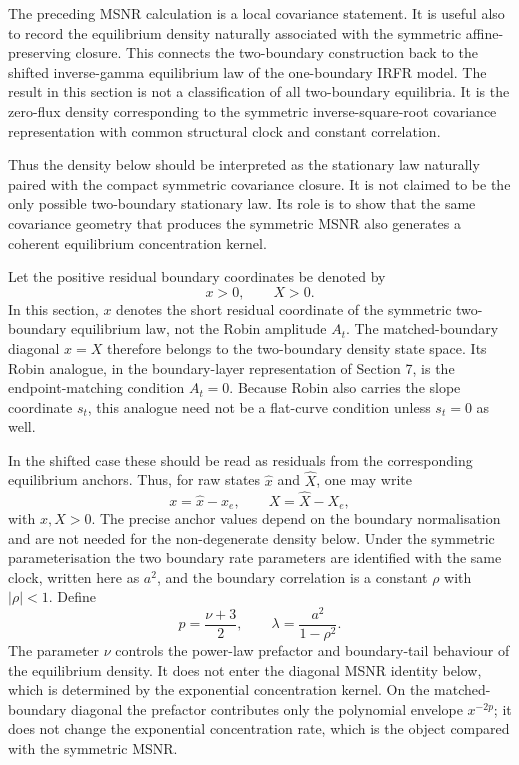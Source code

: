 \documentclass[11pt]{article}
\numberwithin{equation}{section}
\begin{document}
The preceding MSNR calculation is a local covariance statement. It is useful also to record the equilibrium density naturally associated with the symmetric affine-preserving closure. This connects the two-boundary construction back to the shifted inverse-gamma equilibrium law of the one-boundary IRFR model. The result in this section is not a classification of all two-boundary equilibria. It is the zero-flux density corresponding to the symmetric inverse-square-root covariance representation with common structural clock and constant correlation.

Thus the density below should be interpreted as the stationary law naturally paired with the compact symmetric covariance closure. It is not claimed to be the only possible two-boundary stationary law. Its role is to show that the same covariance geometry that produces the symmetric MSNR also generates a coherent equilibrium concentration kernel.

Let the positive residual boundary coordinates be denoted by
\[
x>0,
\qquad
X>0.
\]
In this section, \(x\) denotes the short residual coordinate of the symmetric two-boundary equilibrium law, not the Robin amplitude \(A_t\). The matched-boundary diagonal \(x=X\) therefore belongs to the two-boundary density state space. Its Robin analogue, in the boundary-layer representation of Section 7, is the endpoint-matching condition \(A_t=0\). Because Robin also carries the slope coordinate \(s_t\), this analogue need not be a flat-curve condition unless \(s_t=0\) as well.

In the shifted case these should be read as residuals from the corresponding equilibrium anchors. Thus, for raw states \(\hat x\) and \(\hat X\), one may write
\[
        x=\hat x-x_e,
        \qquad
        X=\hat X-X_e,
\]
with \(x,X>0\). The precise anchor values depend on the boundary normalisation and are not needed for the non-degenerate density below. Under the symmetric parameterisation the two boundary rate parameters are identified with the same clock, written here as \(a^2\), and the boundary correlation is a constant \(\rho\) with \(|\rho|<1\). Define
\[
p=\frac{\nu+3}{2},
\qquad
\lambda=\frac{a^2}{1-\rho^2}.
\]
The parameter \(\nu\) controls the power-law prefactor and boundary-tail behaviour of the equilibrium density. It does not enter the diagonal MSNR identity below, which is determined by the exponential concentration kernel. On the matched-boundary diagonal the prefactor contributes only the polynomial envelope \(x^{-2p}\); it does not change the exponential concentration rate, which is the object compared with the symmetric MSNR.
\end{document}
